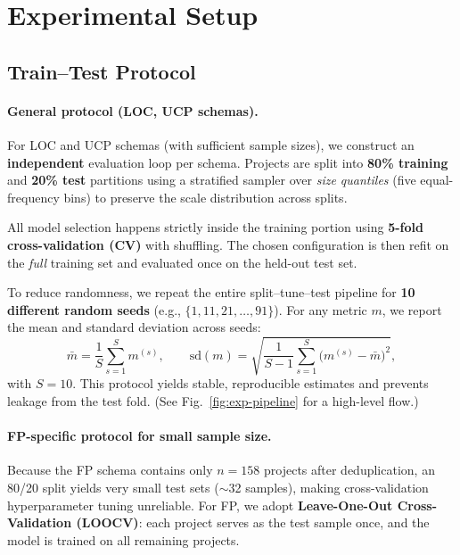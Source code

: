 \documentclass{ieeeaccess}
\begin{document}

\section{Experimental Setup}
\label{sec:exp-setup}


\subsection{Train–Test Protocol}

\paragraph{General protocol (LOC, UCP schemas).}
For LOC and UCP schemas (with sufficient sample sizes), 
we construct an \textbf{independent} evaluation loop per schema. 
Projects are split into \textbf{80\% training} and \textbf{20\% test} partitions 
using a stratified sampler over \emph{size quantiles} (five equal-frequency bins) 
to preserve the scale distribution across splits. 

All model selection happens strictly inside the training portion using 
\textbf{5-fold cross-validation (CV)} with shuffling. 
The chosen configuration is then refit on the \emph{full} training set 
and evaluated once on the held-out test set.

To reduce randomness, we repeat the entire split–tune–test pipeline 
for \textbf{10 different random seeds} 
(e.g., $\{1, 11, 21, \ldots, 91\}$). 
For any metric $m$, we report the mean and standard deviation across seeds:
\[
\bar{m}=\frac{1}{S}\sum_{s=1}^{S} m^{(s)},\qquad
\mathrm{sd}(m)=\sqrt{\frac{1}{S-1}\sum_{s=1}^{S}\!\bigl(m^{(s)}-\bar{m}\bigr)^2},
\]
with $S{=}10$. 
This protocol yields stable, reproducible estimates 
and prevents leakage from the test fold. 
(See Fig.~\ref{fig:exp-pipeline} for a high-level flow.)

\paragraph{FP-specific protocol for small sample size.}
Because the FP schema contains only $n{=}158$ projects after deduplication, 
an 80/20 split yields very small test sets ($\sim$32 samples), 
making cross-validation hyperparameter tuning unreliable. 
For FP, we adopt \textbf{Leave-One-Out Cross-Validation (LOOCV)}: 
each project serves as the test sample once, and the model is trained on all remaining projects.
\end{document}
